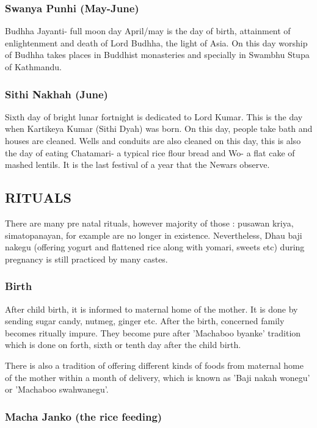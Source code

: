 \documentclass[a4paper,13pt, margin=0.9in]{article}
\begin{document}
\begin{flushleft}
	\subsubsection{Swanya Punhi (May-June)}

	Budhha Jayanti- full moon day April/may is the day of birth, attainment of enlightenment and death of Lord Budhha, the light of Asia. On this day worship of Budhha takes places in Buddhist monasteries and specially in Swambhu Stupa of Kathmandu.

	\subsubsection{Sithi Nakhah (June)}

	Sixth day of bright lunar fortnight is dedicated to Lord Kumar. This is the day when Kartikeya Kumar (Sithi Dyah) was born. On this day, people take bath and houses are cleaned. Wells and conduits are also cleaned on this day, this is also the day of eating Chatamari- a typical rice flour bread and Wo- a flat cake of mashed lentils. It is the last festival of a year that the Newars observe.


	\newpage

	\subsection{RITUALS}

	There are many pre natal rituals, however majority of those : pusawan kriya, simatopanayan, for example are no longer in existence. Nevertheless, Dhau baji nakegu (offering yogurt and flattened rice along with yomari, sweets etc) during pregnancy is still practiced by many castes.

	\subsubsection{Birth}

	After child birth, it is informed to maternal home of the mother. It is done by sending sugar candy, nutmeg, ginger etc. After the birth, concerned family becomes ritually impure. They become pure after 'Machaboo byanke' tradition which is done on forth, sixth or tenth day after the child birth.

	There is also a tradition of offering different kinds of foods from maternal home of the mother within a month of delivery, which is known as 'Baji nakah wonegu' or 'Machaboo swahwanegu'.

	\subsubsection{Macha Janko (the rice feeding)}


\end{flushleft}
\end{document}
